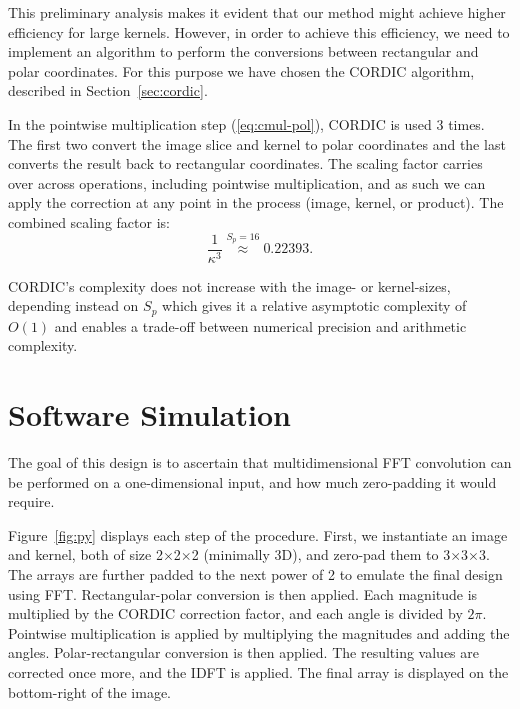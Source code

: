 This preliminary analysis makes it evident that our method might achieve higher efficiency for large kernels. However, in order to achieve this efficiency, we need to implement an algorithm to perform the conversions between rectangular and polar coordinates. For this purpose we have chosen the CORDIC algorithm, described in Section~\ref{sec:cordic}.

In the pointwise multiplication step (\ref{eq:cmul-pol}), CORDIC is used 3 times. The first two convert the image slice and kernel to polar coordinates and the last converts the result back to rectangular coordinates. The scaling factor carries over across operations, including pointwise multiplication, and as such we can apply the correction at any point in the process (image, kernel, or product). The combined scaling factor is:
%
\begin{equation}\label{eq:cordic-kappa}
  \frac{1}{\kappa^3} \stackrel{S_p=16}{\approx} 0.22393.
\end{equation}


CORDIC's complexity does not increase with the image- or kernel-sizes, depending instead on $S_p$ which gives it a relative asymptotic complexity of $O(1)$ and enables a trade-off between numerical precision and arithmetic complexity.

\section{Software Simulation}

The goal of this design is to ascertain that multidimensional FFT convolution can be performed on a one-dimensional input, and how much zero-padding it would require.

Figure~\ref{fig:py} displays each step of the procedure. First, we instantiate an image and kernel, both of size 2$\times$2$\times$2 (minimally 3D), and zero-pad them to 3$\times$3$\times$3. The arrays are further padded to the next power of 2 to emulate the final design using FFT. Rectangular-polar conversion is then applied. Each magnitude is multiplied by the CORDIC correction factor, and each angle is divided by $2\pi$. Pointwise multiplication is applied by multiplying the magnitudes and adding the angles. Polar-rectangular conversion is then applied. The resulting values are corrected once more, and the IDFT is applied. The final array is displayed on the bottom-right of the image.

